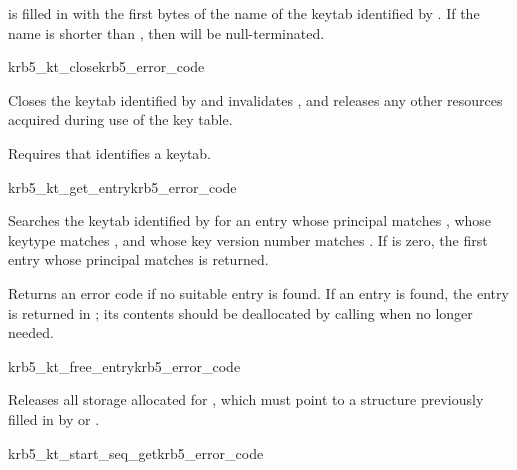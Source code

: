  is filled in with the first  bytes of
the name of the keytab identified by .
If the name is shorter than , then 
will be null-terminated.

\begin{funcdecl}{krb5_kt_close}{krb5_error_code}{\funcinout}
\end{funcdecl}

Closes the keytab identified by  and invalidates
, and releases any other resources acquired during use of
the key table.

Requires that  identifies a keytab.

\begin{funcdecl}{krb5_kt_get_entry}{krb5_error_code}{\funcinout}
\funcin
{}
\funcout
{}
\end{funcdecl}

\begin{sloppypar}
Searches the keytab identified by  for an entry whose
principal matches , whose keytype matches 
, and
whose key version number matches .  If  is
zero, the first entry whose principal matches is returned.
\end{sloppypar}

Returns an error code if no suitable entry is found.  If an entry is
found, the entry is returned in ; its contents should
be deallocated by calling  when no longer
needed.

\begin{funcdecl}{krb5_kt_free_entry}{krb5_error_code}{\funcinout}
\end{funcdecl}

Releases all storage allocated for , which must point
to a structure previously filled in by  or
.

\begin{funcdecl}{krb5_kt_start_seq_get}{krb5_error_code}{\funcinout}
\funcout
{}
\end{funcdecl}

